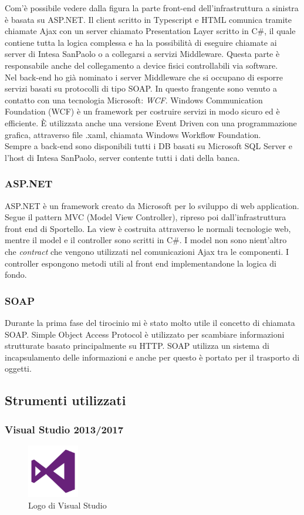 Com'è possibile vedere dalla figura la parte front-end dell'infrastruttura a sinistra è basata su ASP.NET. Il client scritto in Typescript e HTML comunica tramite chiamate Ajax con un server chiamato Presentation Layer scritto in C\#, il quale contiene tutta la logica complessa e ha la possibilità di eseguire chiamate ai server di Intesa SanPaolo o a collegarsi a servizi Middleware. Questa parte è responsabile anche del collegamento a device fisici controllabili via software. \\
Nel back-end ho già nominato i server Middleware che si occupano di esporre servizi basati su protocolli di tipo SOAP. In questo frangente sono venuto a contatto con una tecnologia Microsoft: \textit{WCF}. Windows Communication Foundation (WCF) è un framework per costruire servizi in modo sicuro ed è efficiente. È utilizzata anche una versione Event Driven con una programmazione grafica, attraverso file .xaml, chiamata Windows Workflow Foundation. \\
Sempre a back-end sono disponibili tutti i DB basati su Microsoft SQL Server e l'host di Intesa SanPaolo, server contente tutti i dati della banca. \\

\subsubsection{ASP.NET}
ASP.NET è un framework creato da Microsoft per lo sviluppo di web application. Segue il pattern MVC (Model View Controller), ripreso poi dall'infrastruttura front end di Sportello. La view è costruita attraverso le normali tecnologie web, mentre il model e il controller sono scritti in C\#. I model non sono nient'altro che \textit{contract} che vengono utilizzati nel comunicazioni Ajax tra le componenti. I controller espongono metodi utili al front end implementandone la logica di fondo.  

\subsubsection{SOAP}
Durante la prima fase del tirocinio mi è stato molto utile il concetto di chiamata SOAP. Simple Object Access Protocol è utilizzato per scambiare informazioni strutturate basato principalmente su HTTP. SOAP utilizza un sistema di incapsulamento delle informazioni e anche per questo è portato per il trasporto di oggetti.

\subsection{Strumenti utilizzati}

\subsubsection{Visual Studio 2013/2017}
\begin{figure}[h]
	\includegraphics[width=0.2\textwidth]{./res/img/visual-studio-2013-logo.png}
    \caption{Logo di Visual Studio}
\end{figure}